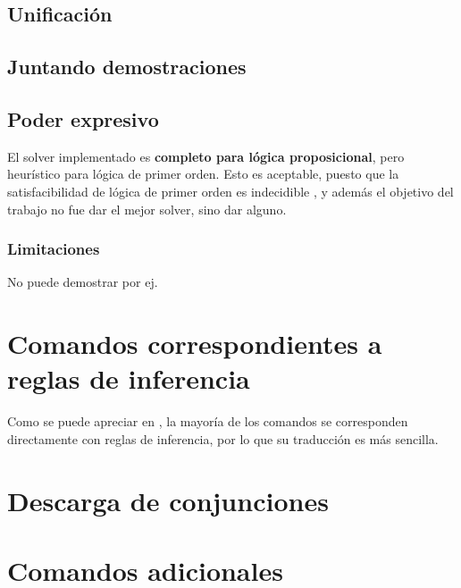 \subsection{Unificación}
\label{ppa:sec:unification}

\subsection{Juntando demostraciones}


\subsection{Poder expresivo}


El solver implementado es \textbf{completo para lógica proposicional}, pero heurístico para lógica de primer orden. Esto es aceptable, puesto que la satisfacibilidad de lógica de primer orden es indecidible , y además el objetivo del trabajo no fue dar el mejor solver, sino dar alguno.

\begin{theorem}
\end{theorem}

\subsubsection{Limitaciones}

No puede demostrar por ej.




\section{Comandos correspondientes a reglas de inferencia}

Como se puede apreciar en , la
mayoría de los comandos se corresponden directamente con reglas de inferencia,
por lo que su traducción es más sencilla.


\section{Descarga de conjunciones}

\section{Comandos adicionales}



